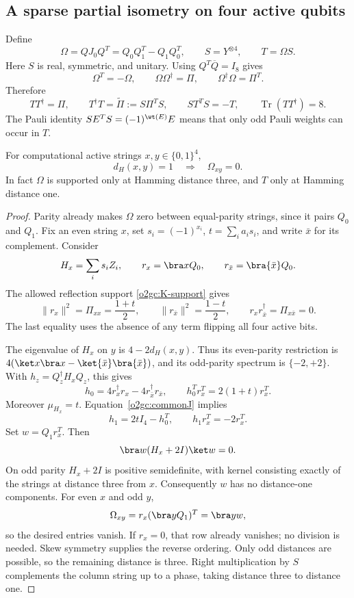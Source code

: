 \subsection{A sparse partial isometry on four active qubits}
\label{o2gc:subsec-T}

Define
\begin{equation}
 \Omega=QJ_0Q^T=Q_0Q_1^T-Q_1Q_0^T,\qquad
 S=Y^{\otimes4},\qquad T=\Omega S.
 \label{o2gc:T-definition}
\end{equation}
Here \(S\) is real, symmetric, and unitary. Using
\(Q^T\overline Q=I_8\) gives
\[
 \Omega^T=-\Omega,\qquad
 \Omega\Omega^\dagger=\Pi,\qquad
 \Omega^\dagger\Omega=\Pi^T.
\]
Therefore
\begin{equation}
 TT^\dagger=\Pi,\qquad
 T^\dagger T=\widetilde\Pi:=S\Pi^TS,\qquad
 ST^TS=-T,\qquad \operatorname{Tr}(TT^\dagger)=8.
 \label{o2gc:partial-isometry}
\end{equation}
The Pauli identity \(SE^TS=(-1)^{\wt(E)}E\) means that only odd
Pauli weights can occur in \(T\).

\begin{lemma}
\label{o2gc:lem-edges}
For computational active strings \(x,y\in\{0,1\}^4\),
\[
 d_H(x,y)=1\quad\Longrightarrow\quad\Omega_{xy}=0.
\]
In fact \(\Omega\) is supported only at Hamming distance three, and
\(T\) only at Hamming distance one.
\end{lemma}

\begin{proof}
Parity already makes \(\Omega\) zero between equal-parity strings,
since it pairs \(Q_0\) and \(Q_1\). Fix an even string \(x\), set
\(s_i=(-1)^{x_i}\), \(t=\sum_i a_is_i\), and write \(\bar x\) for
its complement. Consider
\[
 H_x=\sum_i s_iZ_i,\qquad
 r_x=\bra xQ_0,\qquad r_{\bar x}=\bra{\bar x}Q_0.
\]
The allowed reflection support \eqref{o2gc:K-support} gives
\[
 \|r_x\|^2=\Pi_{xx}=\frac{1+t}{2},\qquad
 \|r_{\bar x}\|^2=\frac{1-t}{2},\qquad
 r_xr_{\bar x}^\dagger=\Pi_{x\bar x}=0.
\]
The last equality uses the absence of any term flipping all four
active bits.

The eigenvalue of \(H_x\) on \(y\) is \(4-2d_H(x,y)\). Thus its
even-parity restriction is
\(4(\ket x\bra x-\ket{\bar x}\bra{\bar x})\), and its odd-parity
spectrum is \(\{-2,+2\}\). With \(h_z=Q_z^\dagger H_xQ_z\), this gives
\[
 h_0=4r_x^\dagger r_x-4r_{\bar x}^\dagger r_{\bar x},\qquad
 h_0^Tr_x^T=2(1+t)r_x^T.
\]
Moreover \(\mu_{H_x}=t\). Equation~\eqref{o2gc:commonJ} implies
\[
 h_1=2tI_4-h_0^T,\qquad h_1r_x^T=-2r_x^T.
\]
Set \(w=Q_1r_x^T\). Then
\[
 \bra w(H_x+2I)\ket w=0.
\]
On odd parity \(H_x+2I\) is positive semidefinite, with kernel
consisting exactly of the strings at distance three from \(x\).
Consequently \(w\) has no distance-one components. For even \(x\)
and odd \(y\),
\[
 \Omega_{xy}=r_x(\bra yQ_1)^T=\bra y w,
\]
so the desired entries vanish. If \(r_x=0\), that row already vanishes;
no division is needed. Skew symmetry supplies the reverse ordering.
Only odd distances are possible, so the remaining distance is three.
Right multiplication by \(S\) complements the column string up to a
phase, taking distance three to distance one.
\end{proof}

